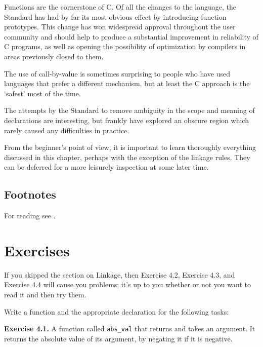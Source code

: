   Functions are the cornerstone of C. Of all the changes to the language,
   the Standard has had by far its most obvious effect by introducing
   function prototypes. This change has won widespread approval throughout
   the user community and should help to produce a substantial improvement
   in reliability of C programs, as well as opening the possibility of
   optimization by compilers in areas previously closed to them.


  The use of call-by-value is sometimes surprising to people who have
   used languages that prefer a different mechanism, but at least the C
   approach is the `safest' most of the time.


  The attempts by the Standard to remove ambiguity in the scope and
   meaning of declarations are interesting, but frankly have explored an
   obscure region which rarely caused any difficulties in practice.


  From the beginner's point of view, it is important to learn thoroughly
   everything discussed in this chapter, perhaps with the exception of the
   linkage rules. They can be deferred for a more leisurely inspection at
   some later time.

   \subsection{Footnotes}%
       For reading see \cite{Stro}. 




        \section{Exercises}
        


  If you skipped the section on Linkage, then Exercise 4.2,
   Exercise 4.3, and Exercise 4.4 will cause you
   problems; it's up to you whether or not you want to read it and then try
   them.


  Write a function and the appropriate declaration for the following
   tasks:


  \textbf{Exercise 4.1.} A function called \texttt{abs\_val} that returns
   \kint{} and takes an \kint{} argument. It returns the
   absolute value of its argument, by negating it if it is
   negative.


